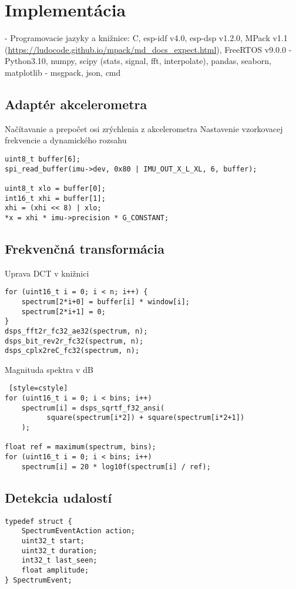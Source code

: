 \chapter{Implementácia}
- Programovacie jazyky a knižnice: 
	C, esp-idf v4.0, esp-dsp v1.2.0, MPack v1.1 (\url{https://ludocode.github.io/mpack/md_docs_expect.html}), FreeRTOS v9.0.0
- Python3.10, numpy, scipy (stats, signal, fft, interpolate), pandas, seaborn, matplotlib
- msgpack, json, cmd


\section{Adaptér akcelerometra}
Načítavanie a prepočet osi zrýchlenia z akcelerometra %
Nastavenie vzorkovacej frekvencie a dynamického rozsahu

\begin{lstlisting}[style=cstyle]
uint8_t buffer[6];
spi_read_buffer(imu->dev, 0x80 | IMU_OUT_X_L_XL, 6, buffer);
    
uint8_t xlo = buffer[0];
int16_t xhi = buffer[1];
xhi = (xhi << 8) | xlo;
*x = xhi * imu->precision * G_CONSTANT;
\end{lstlisting}


\section{Frekvenčná transformácia}
Uprava DCT v knižnici
\begin{lstlisting}[style=cstyle,caption=Transformácia do frekvenčnej domény vo funkcii process\_spectrum]
for (uint16_t i = 0; i < n; i++) {
	spectrum[2*i+0] = buffer[i] * window[i];
    spectrum[2*i+1] = 0;
}
dsps_fft2r_fc32_ae32(spectrum, n);
dsps_bit_rev2r_fc32(spectrum, n);
dsps_cplx2reC_fc32(spectrum, n);
\end{lstlisting}
 
Magnituda spektra v dB
\begin{lstlisting} [style=cstyle]         
for (uint16_t i = 0; i < bins; i++)
	spectrum[i] = dsps_sqrtf_f32_ansi(
          square(spectrum[i*2]) + square(spectrum[i*2+1])
    );

float ref = maximum(spectrum, bins);
for (uint16_t i = 0; i < bins; i++)
	spectrum[i] = 20 * log10f(spectrum[i] / ref);
\end{lstlisting}


\section{Detekcia udalostí}
\begin{lstlisting}[style=cstyle]
typedef struct {
    SpectrumEventAction action;
    uint32_t start;
    uint32_t duration;
    int32_t last_seen;
    float amplitude;
} SpectrumEvent;
\end{lstlisting}

